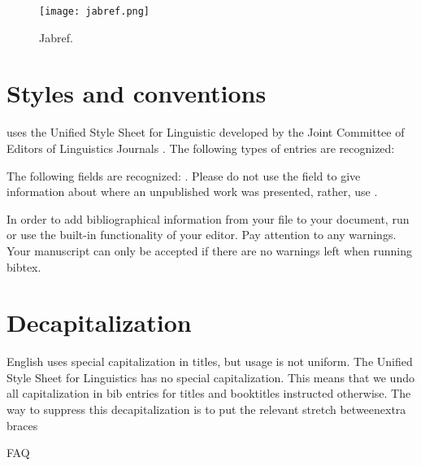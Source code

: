 \begin{figure}
 \texttt{[image: jabref.png]}
 \caption{Jabref.}
 \label{fig:bibtex:jabref}
\end{figure}


\section{Styles and conventions}
\lsp uses the Unified Style Sheet for Linguistic developed by the Joint Committee of Editors of Linguistics Journals . The following types of entries are recognized:

The following fields are recognized:
.
Please do not use the field  to give information about where an unpublished work was presented, rather, use .

In order to add bibliographical information from your \bibtex file to your document, run  or use the built-in functionality of your \latex editor. Pay attention to any warnings. Your manuscript can only be accepted if there are no warnings left when running bibtex.

\section{Decapitalization}
English uses special capitalization in titles, but usage is not uniform. The Unified Style Sheet for Linguistics  has no special capitalization. This means that we undo all capitalization in bib entries for titles and booktitles  instructed otherwise. The way to suppress this decapitalization is to put the relevant stretch betweenextra braces

FAQ



